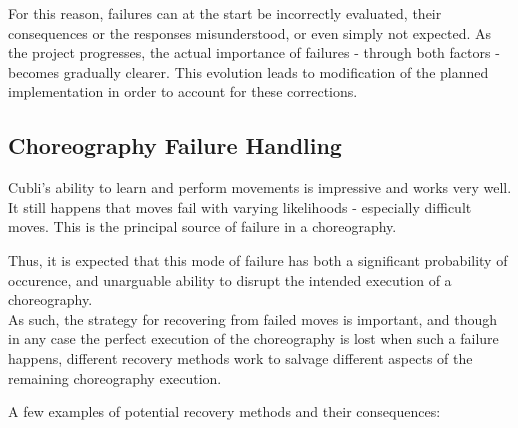For this reason, failures can at the start be incorrectly evaluated, their consequences or the responses misunderstood, or even simply not expected. As the project progresses, the actual importance of failures - through both factors - becomes gradually clearer.  This evolution leads to modification of the planned implementation in order to account for these corrections.

\subsection{Choreography Failure Handling}

Cubli's ability to learn and perform movements is impressive and works very well. It still happens that moves fail with varying likelihoods - especially difficult moves. This is the principal source of failure in a choreography.

Thus, it is expected that this mode of failure has both a significant probability of occurence, and unarguable ability to disrupt the intended execution of a choreography.\\

As such, the strategy for recovering from failed moves is important, and though in any case the perfect execution of the choreography is lost when such a failure happens, different recovery methods work to salvage different aspects of the remaining choreography execution.

A few examples of potential recovery methods and their consequences:\\

